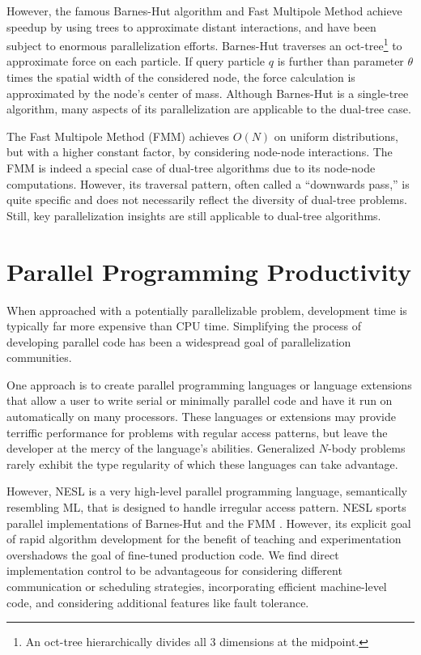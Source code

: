 \documentclass[twoside,leqno,twocolumn]{article}
\begin{document}
However, the famous Barnes-Hut algorithm\cite{barnes_hut} and Fast Multipole Method\cite{greengard_fmm} achieve speedup by using trees to approximate distant interactions, and have been subject to enormous parallelization efforts.
Barnes-Hut\cite{barnes_hut} traverses an oct-tree\footnote{An oct-tree hierarchically divides all 3 dimensions at the midpoint.} to approximate force on each particle.
If query particle $q$ is further than parameter $\theta$ times the spatial width of the considered node, the force calculation is approximated by the node's center of mass.
Although Barnes-Hut is a single-tree algorithm, many aspects of its parallelization are applicable to the dual-tree case.

The Fast Multipole Method (FMM)\cite{greengard_fmm} achieves $O(N)$ on uniform distributions, but with a higher constant factor, by considering node-node interactions.
The FMM is indeed a special case of dual-tree algorithms due to its node-node computations.
However, its traversal pattern, often called a ``downwards pass,'' is quite specific and does not necessarily reflect the diversity of dual-tree problems.
Still, key parallelization insights are still applicable to dual-tree algorithms.


\section{Parallel Programming Productivity}

When approached with a potentially parallelizable problem, development time is typically far more expensive than CPU time.
Simplifying the process of developing parallel code has been a widespread goal of parallelization communities.

One approach is to create parallel programming languages or language extensions that allow a user to write serial or minimally parallel code and have it run on automatically on many processors.
These languages or extensions may provide terriffic performance for problems with regular access patterns, but leave the developer at the mercy of the language's abilities.
Generalized $N$-body problems rarely exhibit the type regularity of which these languages can take advantage.

However, NESL is a very high-level parallel programming language, semantically resembling ML, that is designed to handle irregular access pattern.
NESL sports parallel implementations of Barnes-Hut and the FMM \cite{blelloch_nbody}.
However, its explicit goal of rapid algorithm development for the benefit of teaching and experimentation overshadows the goal of fine-tuned production code.
We find direct implementation control to be advantageous for considering different communication or scheduling strategies, incorporating efficient machine-level code, and considering additional features like fault tolerance.
\end{document}
